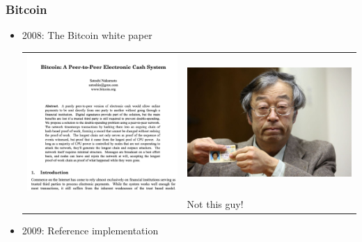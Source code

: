 \documentclass{beamer}
\begin{document}
\begin{frame}
  \frametitle{Bitcoin}
	\begin{itemize}
		\item 2008: The Bitcoin white paper
		
	\begin{tabular}{ll}
	\includegraphics[scale=0.25]{Bitcoin_paper} &
	\includegraphics[scale=0.12]{satoshi} \\ & \hspace{0.5in} Not this guy!
	\end{tabular}
	\pause
		\item 2009: Reference implementation
	\end{itemize}
\end{frame}
\end{document}
